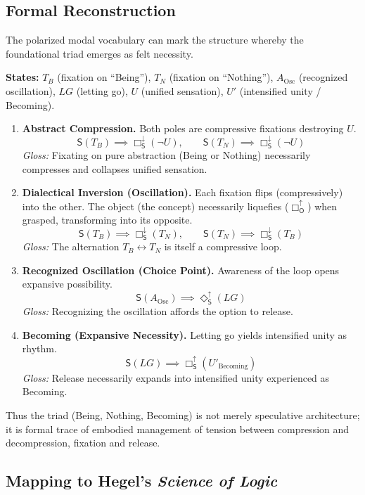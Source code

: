 \documentclass[12pt]{book}
\newcommand{\SBoxUp}{\Box_{\mathsf{S}}^{\uparrow}}
\newcommand{\SBoxDown}{\Box_{\mathsf{S}}^{\downarrow}}
\newcommand{\SDiaUp}{\Diamond_{\mathsf{S}}^{\uparrow}}
\newcommand{\OBoxUp}{\Box_{\mathsf{O}}^{\uparrow}}
\begin{document}
\subsection{Formal Reconstruction}

The polarized modal vocabulary can mark the structure whereby the foundational triad emerges as felt necessity.

\textbf{States:} $T_B$ (fixation on ``Being''), $T_N$ (fixation on ``Nothing''), $A_{\mathrm{Osc}}$ (recognized oscillation), $LG$ (letting go), $U$ (unified sensation), $U'$ (intensified unity / Becoming).

\begin{enumerate}
    \item \textbf{Abstract Compression.} Both poles are compressive fixations destroying $U$.
    \[
        \mathsf{S}(T_B) \implies \SBoxDown(\neg U), \qquad \mathsf{S}(T_N) \implies \SBoxDown(\neg U)
    \]
    	\textit{Gloss:} Fixating on pure abstraction (Being or Nothing) necessarily compresses and collapses unified sensation.

    \item \textbf{Dialectical Inversion (Oscillation).} Each fixation flips (compressively) into the other. The object (the concept) necessarily liquefies ($\OBoxUp$) when grasped, transforming into its opposite.
    \[
        \mathsf{S}(T_B) \implies \SBoxDown(T_N), \qquad \mathsf{S}(T_N) \implies \SBoxDown(T_B)
    \]
    	\textit{Gloss:} The alternation $T_B \leftrightarrow T_N$ is itself a compressive loop.

    \item \textbf{Recognized Oscillation (Choice Point).} Awareness of the loop opens expansive possibility.
    \[
        \mathsf{S}(A_{\mathrm{Osc}}) \implies \SDiaUp(LG)
    \]
    	\textit{Gloss:} Recognizing the oscillation affords the option to release.

    \item \textbf{Becoming (Expansive Necessity).} Letting go yields intensified unity as rhythm.
    \[
        \mathsf{S}(LG) \implies \SBoxUp(U'_{\text{Becoming}})
    \]
    	\textit{Gloss:} Release necessarily expands into intensified unity experienced as Becoming.
\end{enumerate}

Thus the triad (Being, Nothing, Becoming) is not merely speculative architecture; it is formal trace of embodied management of tension between compression and decompression, fixation and release.

\subsection{Mapping to Hegel's \textit{Science of Logic}}
\end{document}
